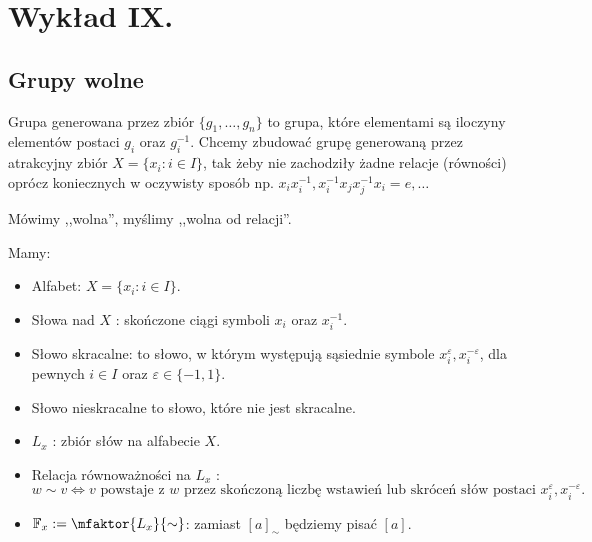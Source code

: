 \chapter{Wykład IX.}

\section{Grupy wolne}

Grupa generowana przez zbiór $\{g_1,\ldots,g_{n} \} $ to grupa, które elementami są iloczyny elementów postaci $g_{i}$ oraz $g_{i}^{-1}$. Chcemy zbudować grupę generowaną przez atrakcyjny zbiór $X = \{x_{i}: i \in I\} $, tak żeby nie zachodziły żadne relacje (równości) oprócz koniecznych w oczywisty sposób  np. $x_{i}x_{i}^{-1}, x_{i}^{-1}x_{j}x_{j}^{-1}x_{i} = e, \ldots$

Mówimy ,,wolna'', myślimy ,,wolna od relacji''.

\begin{definition}
	Mamy:
	\begin{itemize}
		\item Alfabet: $X = \{x_{i}: i \in I\} $.
		\item Słowa nad $X$ : skończone ciągi symboli $x_{i}$ oraz $x_{i}^{-1}$.
		\item Słowo skracalne: to słowo, w którym występują sąsiednie symbole $x_{i}^{\varepsilon }, x_{i}^{-\varepsilon }$, dla pewnych $i\in I$ oraz $\varepsilon \in \{-1,1\} $.
		\item Słowo nieskracalne to słowo, które nie jest skracalne.
		\item $L_{x}$ : zbiór słów na alfabecie $X$.
		\item Relacja równoważności na $L_{x}$ :
			\[
			w\sim v \iff v \text{ powstaje z } w \text{ przez skończoną liczbę wstawień lub skróceń słów postaci } x_{i}^{\varepsilon }, x_{i}^{-\varepsilon } 
			.\] 
		\item $\mathbb{F}_{x} := \mfaktor{L_{x}}{\sim  } $: zamiast $\left[ a \right] _{\sim}$ będziemy pisać $\left[ a \right] $.
	\end{itemize}
\end{definition} 

